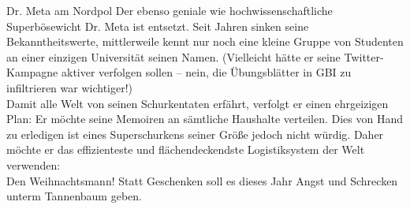 
\daniel{}


\begin{frame}{Dr. Meta am Nordpol}
	Der ebenso geniale wie hochwissenschaftliche Superbösewicht Dr. Meta ist entsetzt.
	Seit Jahren sinken seine Bekanntheitswerte, mittlerweile kennt nur noch eine kleine Gruppe von Studenten an einer einzigen Universität seinen Namen. (Vielleicht hätte er seine Twitter-Kampagne aktiver verfolgen sollen – nein, die Übungsblätter in GBI zu infiltrieren war wichtiger!)\\
	\bigskip \pause
	Damit alle Welt von seinen Schurkentaten erfährt, verfolgt er einen ehrgeizigen Plan: Er möchte seine Memoiren an sämtliche Haushalte verteilen. Dies von Hand zu erledigen ist eines Superschurkens seiner Größe jedoch nicht würdig. Daher möchte er das effizienteste und flächendeckendste Logistiksystem der Welt verwenden:\\ 
	Den Weihnachtsmann! Statt Geschenken soll es dieses Jahr Angst und Schrecken unterm Tannenbaum geben.
\end{frame}

